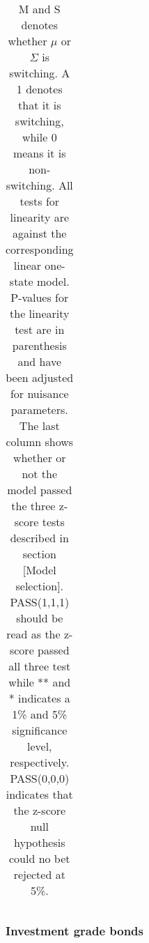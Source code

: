 \documentclass[11pt,a4paper,oneside]{article}
\begin{document}
\begin{table}[h!]
\begin{tabular}{lrrrrrrrr}



\bottomrule
\end{tabular}
\caption*{M and S denotes whether $\mu$ or $\Sigma$ is switching. A 1 denotes that it is switching, while 0 means it is non-switching. All tests for linearity are against the corresponding linear one-state model. P-values for the linearity test are in parenthesis and have been adjusted for nuisance parameters. The last column shows whether or not the model passed the three z-score tests described in section [Model selection]. PASS(1,1,1) should be read as the z-score passed all three test while ** and * indicates a 1\% and 5\% significance level, respectively. PASS(0,0,0) indicates that the z-score null hypothesis could no bet rejected at 5\%.}
\vspace{-20mm}
\end{table}

\newpage
{}
\recalctypearea
 



\subsubsection*{Investment grade bonds }

\newpage
{}
\recalctypearea
\end{document}
